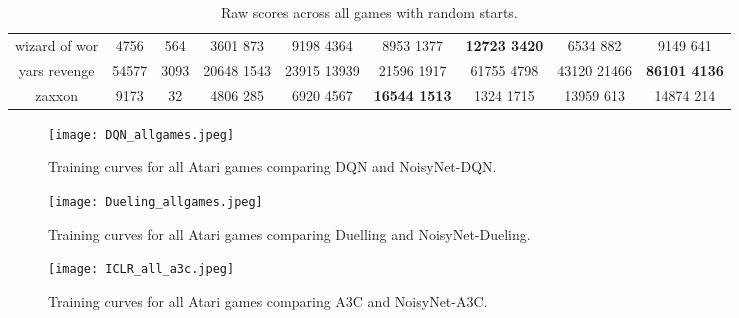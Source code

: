 \documentclass{article}
\newcommand{\algoinit}{NoisyNet}
\begin{document}
\begin{table}[!ht]
\begin{tabular}{|c|c|c|c|c|c|c|c|c|}
 wizard of wor & 4756 & 564 & 3601  873 & 9198  4364 & 8953  1377 & \bf{12723  3420} & 6534  882 & 9149  641 \\
 yars revenge & 54577 & 3093 & 20648  1543 & 23915  13939 & 21596  1917 & 61755  4798 & 43120  21466 & \bf{86101  4136} \\
 zaxxon & 9173 & 32 & 4806  285 & 6920  4567 & \bf{16544  1513} & 1324  1715 & 13959  613 & 14874  214 \\
\hline
\end{tabular}
\caption{Raw scores across all games with random starts.}
\label{tl:raw.score}
\end{table}

\newpage


\begin{figure}[!ht]
\begin{centering}
    \texttt{[image: DQN\_allgames.jpeg]}
    \caption{Training curves for all Atari games comparing DQN and \algoinit{}-DQN.}
    \label{fig:all_games_dqn}    
    \end{centering}
\end{figure}

\newpage

\begin{figure}[!ht]
\begin{centering}
    \texttt{[image: Dueling\_allgames.jpeg]}
    \caption{Training curves for all Atari games comparing Duelling and \algoinit{}-Dueling.}
    \label{fig:all_games_Dueling}    
    \end{centering}
\end{figure}

\newpage

\begin{figure}[!htp]
\begin{centering}
    \texttt{[image: ICLR\_all\_a3c.jpeg]}
    \caption{Training curves for all Atari games comparing A3C and \algoinit{}-A3C.}
    \label{fig:all_games_a3c}    
    \end{centering}
\end{figure}


 
\end{document}
